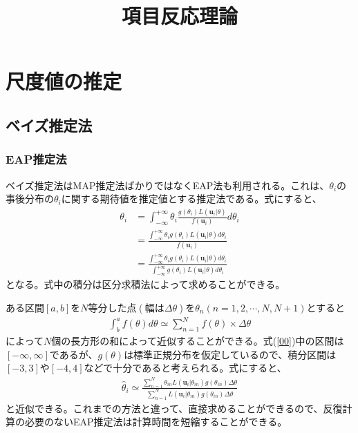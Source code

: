 \documentclass[12pt]{jarticle}
\title{項目反応理論}
\begin{document}
\maketitle
\setcounter{section}{2}
\section{尺度値の推定}
\setcounter{subsection}{3}
\subsection{ベイズ推定法}
\setcounter{subsubsection}{2}
\subsubsection{EAP推定法}
ベイズ推定法はMAP推定法ばかりではなくEAP法も利用される。これは、$\theta_i$の事後分布の$\theta_i$に関する期待値を推定値とする推定法である。式にすると、
\begin{align*}
  \label{00}
  \displaystyle \theta_i &= \int_{-\infty}^{+\infty} \theta_i \frac{g(\theta_i)L(\boldsymbol{u}_i|\theta)}{f(\boldsymbol{u}_i)}  d\theta_i  \\
  &= \frac{\displaystyle\int_{-\infty}^{+\infty} \theta_i g(\theta_i)L(\boldsymbol{u}_i|\theta) d\theta_i}{f(\boldsymbol{u}_i)} \\
  &= \frac{\displaystyle\int_{-\infty}^{+\infty} \theta_i g(\theta_i)L(\boldsymbol{u}_i|\theta) d\theta_i}{\displaystyle\int_{-\infty}^{+\infty}  g(\theta_i)L(\boldsymbol{u}_i|\theta) d\theta_i}\tag{3.35}
\end{align*}
となる。式中の積分は区分求積法によって求めることができる。

ある区間$[a,b]$を$N$等分した点$(幅は\Delta \theta)$を$\theta_n(n = 1,2,\cdots ,N,N+1)$とすると
\begin{align}
  \label{01}
  \displaystyle \int_{b}^{a} f(\theta) d\theta \simeq \sum_{n=1}^{N} f(\theta) \times \Delta \theta  \tag{3.36}
\end{align}
によって$N$個の長方形の和によって近似することができる。式(\ref{00})中の区間は$[-\infty,\infty]$であるが、$g(\theta)$は標準正規分布を仮定しているので、積分区間は$[-3,3]$や$[-4,4]$などで十分であると考えられる。式にすると、
\begin{align}
  \label{02}
  \displaystyle \hat{\theta}_i \simeq \frac{\displaystyle\sum_{n=1}^{N} \theta_{in} L(\boldsymbol{u}_i | \theta_{in})g(\theta_{in})\Delta \theta}{\displaystyle\sum_{n=1}^{N} L(\boldsymbol{u}_i | \theta_{in})g(\theta_{in})\Delta \theta}  \tag{3.37}
\end{align}
と近似できる。これまでの方法と違って、直接求めることができるので、反復計算の必要のないEAP推定法は計算時間を短縮することができる。
\end{document}
